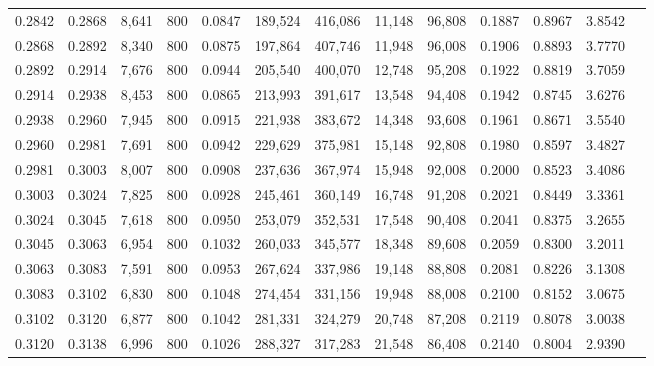 \begin{tabular}{rrrrrrrrrrrrr}
0.2842 & 0.2868 &  8,641 &   800 &                                     0.0847 & 189,524 & 416,086 &  11,148 &  96,808 & 0.1887 & 0.8967 & 3.8542 \\
0.2868 & 0.2892 &  8,340 &   800 &                                     0.0875 & 197,864 & 407,746 &  11,948 &  96,008 & 0.1906 & 0.8893 & 3.7770 \\
0.2892 & 0.2914 &  7,676 &   800 &                                     0.0944 & 205,540 & 400,070 &  12,748 &  95,208 & 0.1922 & 0.8819 & 3.7059 \\
0.2914 & 0.2938 &  8,453 &   800 &                                     0.0865 & 213,993 & 391,617 &  13,548 &  94,408 & 0.1942 & 0.8745 & 3.6276 \\
0.2938 & 0.2960 &  7,945 &   800 &                                     0.0915 & 221,938 & 383,672 &  14,348 &  93,608 & 0.1961 & 0.8671 & 3.5540 \\
0.2960 & 0.2981 &  7,691 &   800 &                                     0.0942 & 229,629 & 375,981 &  15,148 &  92,808 & 0.1980 & 0.8597 & 3.4827 \\
0.2981 & 0.3003 &  8,007 &   800 &                                     0.0908 & 237,636 & 367,974 &  15,948 &  92,008 & 0.2000 & 0.8523 & 3.4086 \\
0.3003 & 0.3024 &  7,825 &   800 &                                     0.0928 & 245,461 & 360,149 &  16,748 &  91,208 & 0.2021 & 0.8449 & 3.3361 \\
0.3024 & 0.3045 &  7,618 &   800 &                                     0.0950 & 253,079 & 352,531 &  17,548 &  90,408 & 0.2041 & 0.8375 & 3.2655 \\
0.3045 & 0.3063 &  6,954 &   800 &                                     0.1032 & 260,033 & 345,577 &  18,348 &  89,608 & 0.2059 & 0.8300 & 3.2011 \\
0.3063 & 0.3083 &  7,591 &   800 &                                     0.0953 & 267,624 & 337,986 &  19,148 &  88,808 & 0.2081 & 0.8226 & 3.1308 \\
0.3083 & 0.3102 &  6,830 &   800 &                                     0.1048 & 274,454 & 331,156 &  19,948 &  88,008 & 0.2100 & 0.8152 & 3.0675 \\
0.3102 & 0.3120 &  6,877 &   800 &                                     0.1042 & 281,331 & 324,279 &  20,748 &  87,208 & 0.2119 & 0.8078 & 3.0038 \\
0.3120 & 0.3138 &  6,996 &   800 &                                     0.1026 & 288,327 & 317,283 &  21,548 &  86,408 & 0.2140 & 0.8004 & 2.9390 \\

\end{tabular}
